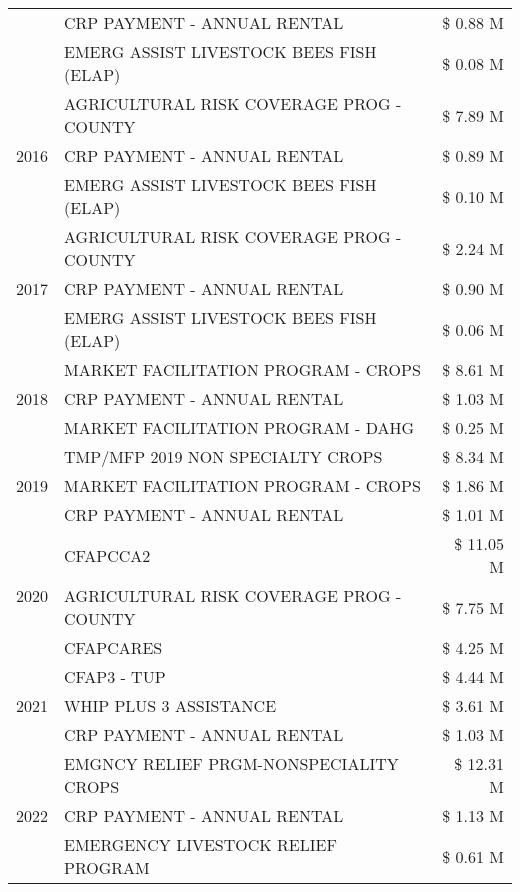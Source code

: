 \begin{tabular}{llr}
 & CRP PAYMENT - ANNUAL RENTAL & \$ 0.88 M \\
 & EMERG ASSIST LIVESTOCK BEES FISH (ELAP) & \$ 0.08 M \\
\cline{1-3}
\multirow[t]{3}{*}{2016} & AGRICULTURAL RISK COVERAGE PROG - COUNTY & \$ 7.89 M \\
 & CRP PAYMENT - ANNUAL RENTAL & \$ 0.89 M \\
 & EMERG ASSIST LIVESTOCK BEES FISH (ELAP) & \$ 0.10 M \\
\cline{1-3}
\multirow[t]{3}{*}{2017} & AGRICULTURAL RISK COVERAGE PROG - COUNTY & \$ 2.24 M \\
 & CRP PAYMENT - ANNUAL RENTAL & \$ 0.90 M \\
 & EMERG ASSIST LIVESTOCK BEES FISH (ELAP) & \$ 0.06 M \\
\cline{1-3}
\multirow[t]{3}{*}{2018} & MARKET FACILITATION PROGRAM - CROPS & \$ 8.61 M \\
 & CRP PAYMENT - ANNUAL RENTAL & \$ 1.03 M \\
 & MARKET FACILITATION PROGRAM - DAHG & \$ 0.25 M \\
\cline{1-3}
\multirow[t]{3}{*}{2019} & TMP/MFP 2019 NON SPECIALTY CROPS & \$ 8.34 M \\
 & MARKET FACILITATION PROGRAM - CROPS & \$ 1.86 M \\
 & CRP PAYMENT - ANNUAL RENTAL & \$ 1.01 M \\
\cline{1-3}
\multirow[t]{3}{*}{2020} & CFAPCCA2 & \$ 11.05 M \\
 & AGRICULTURAL RISK COVERAGE PROG - COUNTY & \$ 7.75 M \\
 & CFAPCARES & \$ 4.25 M \\
\cline{1-3}
\multirow[t]{3}{*}{2021} & CFAP3 - TUP & \$ 4.44 M \\
 & WHIP PLUS 3 ASSISTANCE & \$ 3.61 M \\
 & CRP PAYMENT - ANNUAL RENTAL & \$ 1.03 M \\
\cline{1-3}
\multirow[t]{3}{*}{2022} & EMGNCY RELIEF PRGM-NONSPECIALITY CROPS & \$ 12.31 M \\
 & CRP PAYMENT - ANNUAL RENTAL & \$ 1.13 M \\
 & EMERGENCY LIVESTOCK RELIEF PROGRAM & \$ 0.61 M \\
\cline{1-3}
\bottomrule
\end{tabular}
